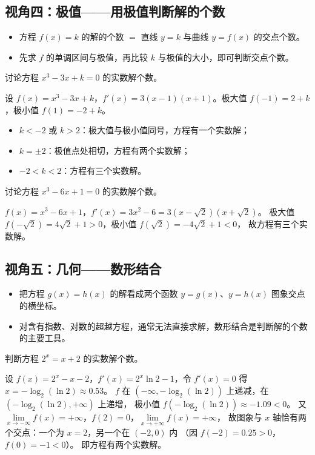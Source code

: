 \begin{explore}
\subsection{视角四：极值——用极值判断解的个数}

\begin{itemize}
  \item 方程 $f(x)=k$ 的解的个数 $=$ 直线 $y=k$ 与曲线 $y=f(x)$ 的交点个数。
  \item 先求 $f$ 的单调区间与极值，再比较 $k$ 与极值的大小，即可判断交点个数。
\end{itemize}

\begin{example}
讨论方程 $x^3-3x+k=0$ 的实数解个数。
\end{example}
\begin{solution}
设 $f(x)=x^3-3x+k$，$f'(x)=3(x-1)(x+1)$。极大值 $f(-1)=2+k$，极小值 $f(1)=-2+k$。
\begin{itemize}
  \item $k<-2$ 或 $k>2$：极大值与极小值同号，方程有一个实数解；
  \item $k=\pm2$：极值点处相切，方程有两个实数解；
  \item $-2<k<2$：方程有三个实数解。
\end{itemize}
\end{solution}

\begin{problem}
讨论方程 $x^3-6x+1=0$ 的实数解个数。
\end{problem}
\begin{solution}
$f(x)=x^3-6x+1$，$f'(x)=3x^2-6=3(x-\sqrt2)(x+\sqrt2)$。
极大值 $f(-\sqrt2)=4\sqrt2+1>0$，极小值 $f(\sqrt2)=-4\sqrt2+1<0$，
故方程有三个实数解。
\end{solution}

\subsection{视角五：几何——数形结合}

\begin{itemize}
  \item 把方程 $g(x)=h(x)$ 的解看成两个函数 $y=g(x)$、$y=h(x)$ 图象交点的横坐标。
  \item 对含有指数、对数的超越方程，通常无法直接求解，数形结合是判断解的个数的主要工具。
\end{itemize}

\begin{example}
判断方程 $2^x=x+2$ 的实数解个数。
\end{example}
\begin{solution}
设 $f(x)=2^x-x-2$，$f'(x)=2^x\ln2-1$，令 $f'(x)=0$ 得 $x=-\log_2(\ln2)\approx0.53$。
$f$ 在 $(-\infty,-\log_2(\ln2))$ 上递减，在 $(-\log_2(\ln2),+\infty)$ 上递增，
极小值 $f(-\log_2(\ln2))\approx-1.09<0$。
又 $\lim\limits_{x\to-\infty}f(x)=+\infty$，$f(2)=0$，$\lim\limits_{x\to+\infty}f(x)=+\infty$，
故图象与 $x$ 轴恰有两个交点：一个为 $x=2$，另一个在 $(-2,0)$ 内
（因 $f(-2)=0.25>0$，$f(0)=-1<0$）。
即方程有两个实数解。
\end{solution}


\end{explore}
